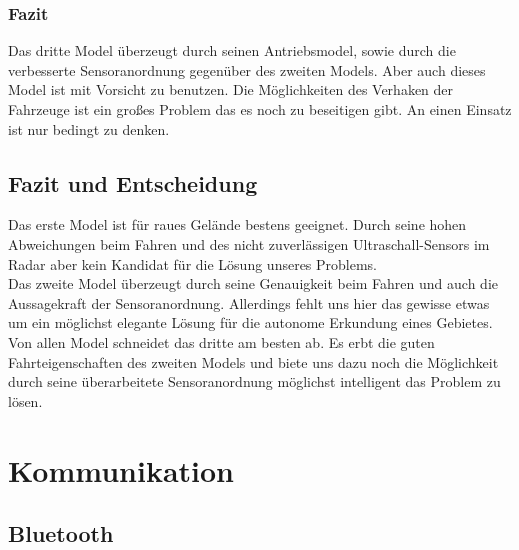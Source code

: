 \documentclass[10pt,a4paper]{scrartcl}
\begin{document}
\subsubsection{Fazit}
Das dritte Model überzeugt durch seinen Antriebsmodel, sowie durch die verbesserte Sensoranordnung gegenüber des zweiten Models. Aber auch dieses Model ist mit Vorsicht zu benutzen. Die Möglichkeiten des Verhaken der Fahrzeuge ist ein großes Problem das es noch zu beseitigen gibt. An einen Einsatz ist nur bedingt zu denken.
\subsection{Fazit und Entscheidung}
Das erste Model ist für raues Gelände bestens geeignet. Durch seine hohen Abweichungen beim Fahren und des nicht zuverlässigen Ultraschall-Sensors im Radar aber kein Kandidat für die Lösung unseres Problems.\\
Das zweite Model überzeugt durch seine Genauigkeit beim Fahren und auch die Aussagekraft der Sensoranordnung. Allerdings fehlt uns hier das gewisse etwas um ein möglichst elegante Lösung für die autonome Erkundung eines Gebietes.\\
Von allen Model schneidet das dritte am besten ab. Es erbt die guten Fahrteigenschaften des zweiten Models und biete uns dazu noch die Möglichkeit durch seine überarbeitete Sensoranordnung möglichst intelligent das Problem zu lösen. 
\section{Kommunikation}
\subsection{Bluetooth}
\end{document}
